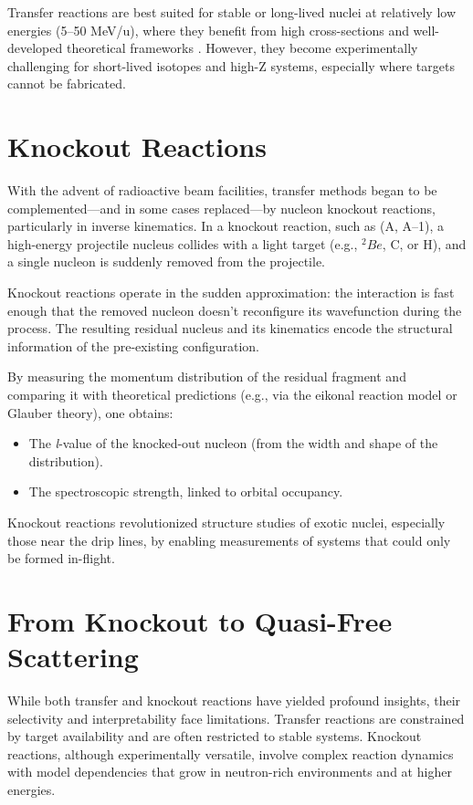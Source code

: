 Transfer reactions are best suited for stable or long-lived nuclei at relatively low energies (5–50 MeV/u), where they benefit from high cross-sections and well-developed theoretical frameworks \cite{direct_reactions_book}. However, they become experimentally challenging for short-lived isotopes and high-Z systems, especially where targets cannot be fabricated.


\section{Knockout Reactions}

With the advent of radioactive beam facilities, transfer methods began to be complemented—and in some cases replaced—by nucleon knockout reactions, particularly in inverse kinematics. In a knockout reaction, such as (A, A–1), a high-energy projectile nucleus collides with a light target (e.g., $^2Be$, C, or H), and a single nucleon is suddenly removed from the projectile.

Knockout reactions operate in the sudden approximation: the interaction is fast enough that the removed nucleon doesn't reconfigure its wavefunction during the process. The resulting residual nucleus and its kinematics encode the structural information of the pre-existing configuration.

By measuring the momentum distribution of the residual fragment and comparing it with theoretical predictions (e.g., via the eikonal reaction model or Glauber theory), one obtains:

\begin{itemize}
	\item The \emph{l}-value of the knocked-out nucleon (from the width and shape of the distribution).
	\item The spectroscopic strength, linked to orbital occupancy.
\end{itemize}


Knockout reactions revolutionized structure studies of exotic nuclei, especially those near the drip lines, by enabling measurements of systems that could only be formed in-flight.

\section{From Knockout to Quasi-Free Scattering}

While both transfer and knockout reactions have yielded profound insights, their selectivity and interpretability face limitations. Transfer reactions are constrained by target availability and are often restricted to stable systems. Knockout reactions, although experimentally versatile, involve complex reaction dynamics with model dependencies that grow in neutron-rich environments and at higher energies.

